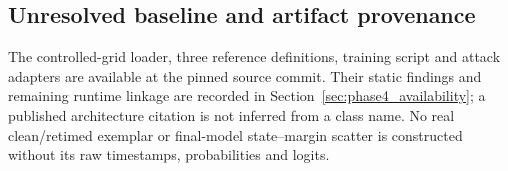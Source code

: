 \subsection{Unresolved baseline and artifact provenance}
The controlled-grid loader, three reference definitions, training script and attack adapters are available at the pinned source commit. Their static findings and remaining runtime linkage are recorded in Section~\ref{sec:phase4_availability}; a published architecture citation is not inferred from a class name. No real clean/retimed exemplar or final-model state--margin scatter is constructed without its raw timestamps, probabilities and logits.
